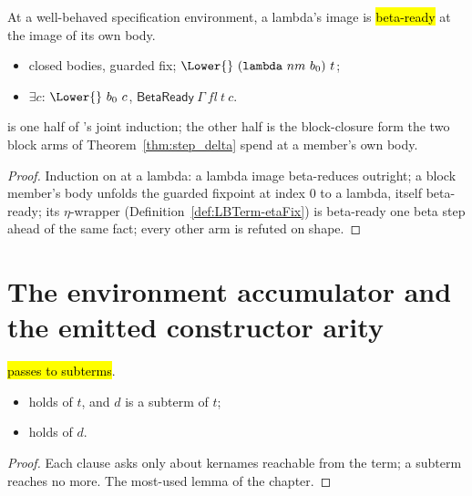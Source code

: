 \begin{lemma}
\label{lem:Lower-appReady}
\leanok
{}
 At a well-behaved specification environment, a lambda's image is \hl{beta-ready} at the
image of its own body.
\begin{itemize}
\item {} closed bodies, guarded fix; $\Lower{}\ (\mathtt{lambda}\ nm\ b_0)\ t$;
\item {} $\exists c$: $\Lower{}\ b_0\ c$, $\mathsf{BetaReady}\ \Gamma\ fl\ t\ c$.
\end{itemize}
  is one half of 's joint induction; the other
half is the block-closure form the two block arms of Theorem~\ref{thm:step_delta} spend at a member's
own body.
\end{lemma}
\begin{proof}
\leanok
{}
 Induction on \Lower{} at a lambda: a lambda image beta-reduces outright; a block member's
body unfolds the guarded fixpoint at index $0$ to a lambda, itself beta-ready; its $\eta$-wrapper
(Definition~\ref{def:LBTerm-etaFix}) is beta-ready one beta step ahead of the same fact; every other arm
is refuted on shape.
\end{proof}

\section{The environment accumulator and the emitted constructor arity}
\label{sec:correctness:env}

\begin{lemma}
\label{lem:ErasesEnv-subterm}
\leanok
{}
 \ErasesEnv{} \hl{passes to subterms}.
\begin{itemize}
\item {} \ErasesEnv{} holds of $t$, and $d$ is a subterm of $t$;
\item {} \ErasesEnv{} holds of $d$.
\end{itemize}
\end{lemma}
\begin{proof}
\leanok
{}
 Each clause asks only about kernames reachable from the term; a subterm reaches no more. The
most-used lemma of the chapter.
\end{proof}

